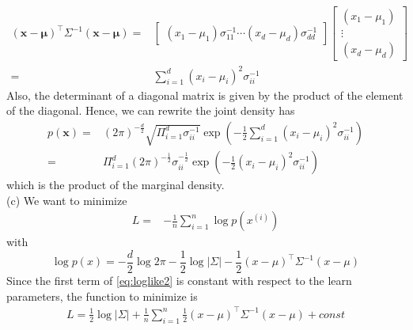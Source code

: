 \documentclass[12pt]{article}
\begin{document}
\begin{equation}
	\begin{split}
		(\bm{x}-\bm{\mu})^\top \Sigma^{-1}(\bm{x}-\bm{\mu})=&
		\begin{bmatrix}
        			(x_1-\mu_1)\sigma_{11}^{-1} 
        			\cdots 
        			 (x_d-\mu_d)\sigma_{dd}^{-1}
    		\end{bmatrix}
		\begin{bmatrix}
        			(x_1-\mu_1) \\
        			\vdots \\
        			 (x_d-\mu_d)
    		\end{bmatrix}\\
		=& \sum_{i=1}^d (x_i-\mu_i)^2 \sigma_{ii}^{-1}
	\end{split}
\end{equation}
Also, the determinant of a diagonal matrix is given by the product of the element of the diagonal. Hence, we can rewrite the joint density has
\begin{equation}
	\begin{split}
		p(\bm{x}) =& (2\pi)^{-\frac{d}{2}}\sqrt{\Pi_{i=1}^d \sigma_{ii}^{-1}}
		\exp\left(
        			-\frac{1}{2}
			\sum_{i=1}^d (x_i-\mu_i)^2 \sigma_{ii}^{-1}
    		\right)\\
		=&\Pi_{i=1}^d (2\pi)^{-\frac{1}{2}} \sigma_{ii}^{-\frac{1}{2}}
		\exp\left(
        			-\frac{1}{2}
			(x_i-\mu_i)^2 \sigma_{ii}^{-1}
    		\right)
	\end{split}
\end{equation}
which is the product of the marginal density.\\
(c) We want to minimize 
\begin{equation}
\begin{split}
    L =& - \frac{1}{n}\sum_{i=1}^n \log p(x^{(i)})
\end{split}
\end{equation}
with
\begin{equation}
    \log p(x) = -\frac{d}{2}\log 2\pi - \frac{1}{2}\log|\Sigma| - \frac{1}{2}(x-\mu)^\top\Sigma^{-1}(x-\mu)
    \label{eq:loglike2}
\end{equation}
Since the first term of \ref{eq:loglike2} is constant with respect to the learn parameters, the function to minimize is
\begin{equation}
\begin{split}
    L = \frac{1}{2}\log|\Sigma| + \frac{1}{n}\sum_{i=1}^n\frac{1}{2}(x-\mu)^\top\Sigma^{-1}(x-\mu) + const
\end{split}
\label{eq:loglike3}
\end{equation}
\end{document}
